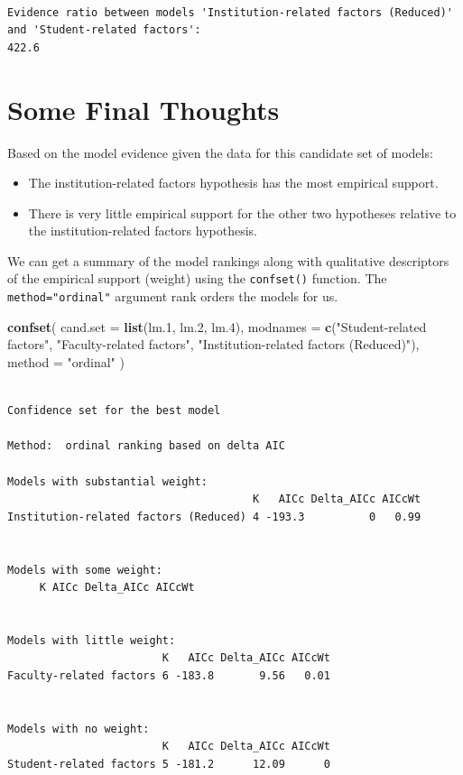 \documentclass[]{book}
\newenvironment{Shaded}{\begin{snugshade}}{\end{snugshade}}
\newcommand{\DataTypeTok}[1]{\textcolor[rgb]{0.13,0.29,0.53}{#1}}
\newcommand{\FloatTok}[1]{\textcolor[rgb]{0.00,0.00,0.81}{#1}}
\newcommand{\KeywordTok}[1]{\textcolor[rgb]{0.13,0.29,0.53}{\textbf{#1}}}
\newcommand{\NormalTok}[1]{#1}
\newcommand{\StringTok}[1]{\textcolor[rgb]{0.31,0.60,0.02}{#1}}
\providecommand{\tightlist}{%
  \setlength{\itemsep}{0pt}\setlength{\parskip}{0pt}}
\begin{document}
\begin{verbatim}

Evidence ratio between models 'Institution-related factors (Reduced)' and 'Student-related factors':
422.6 
\end{verbatim}

\hypertarget{some-final-thoughts}{%
\section{Some Final Thoughts}\label{some-final-thoughts}}

Based on the model evidence given the data for this candidate set of models:

\begin{itemize}
\tightlist
\item
  The institution-related factors hypothesis has the most empirical support.
\item
  There is very little empirical support for the other two hypotheses relative to the institution-related factors hypothesis.
\end{itemize}

We can get a summary of the model rankings along with qualitative descriptors of the empirical support (weight) using the \texttt{confset()} function. The \texttt{method="ordinal"} argument rank orders the models for us.

\begin{Shaded}
\begin{Highlighting}[]
\KeywordTok{confset}\NormalTok{(}
  \DataTypeTok{cand.set =} \KeywordTok{list}\NormalTok{(lm}\FloatTok{.1}\NormalTok{, lm}\FloatTok{.2}\NormalTok{, lm}\FloatTok{.4}\NormalTok{),}
  \DataTypeTok{modnames =} \KeywordTok{c}\NormalTok{(}\StringTok{"Student-related factors"}\NormalTok{, }\StringTok{"Faculty-related factors"}\NormalTok{, }\StringTok{"Institution-related factors (Reduced)"}\NormalTok{),}
  \DataTypeTok{method =} \StringTok{"ordinal"}
\NormalTok{  )}
\end{Highlighting}
\end{Shaded}

\begin{verbatim}

Confidence set for the best model

Method:  ordinal ranking based on delta AIC

Models with substantial weight:
                                      K   AICc Delta_AICc AICcWt
Institution-related factors (Reduced) 4 -193.3          0   0.99


Models with some weight:
     K AICc Delta_AICc AICcWt


Models with little weight:
                        K   AICc Delta_AICc AICcWt
Faculty-related factors 6 -183.8       9.56   0.01


Models with no weight:
                        K   AICc Delta_AICc AICcWt
Student-related factors 5 -181.2      12.09      0
\end{verbatim}
\end{document}
